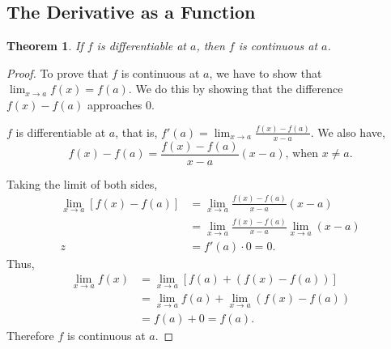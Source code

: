 \documentclass{article}
\newtheorem*{theorem*}{Theorem}
\begin{document}
\subsection{The Derivative as a Function}
\begin{theorem*}
  If $f$ is differentiable at $a$, then $f$ is continuous at $a$.
\end{theorem*}
\begin{proof}
  To prove that $f$ is continuous at $a$, we have to show that $\lim_{x \to a}f(x)=f(a)$. We do this
  by showing that the difference $f(x)-f(a)$ approaches 0.

  $f$ is differentiable at $a$, that is, $f'(a)=\lim_{x \to a}\frac{f(x)-f(a)}{x-a}$. We also have,
  \[f(x)-f(a)=\frac{f(x)-f(a)}{x-a}(x-a)\text{, when $x \neq a.$}\]

  Taking the limit of both sides,
  \begin{align*}
    \lim_{x \to a}\left[f(x)-f(a)\right] & = \lim_{x \to a}\frac{f(x)-f(a)}{x-a}(x-a) \\
    & = \lim_{x \to a}\frac{f(x)-f(a)}{x-a}\lim_{x \to a}(x-a) \\z
    & = f'(a)\cdot0 = 0.
  \end{align*}
  Thus,
  \begin{align*}
    \lim_{x \to a}f(x) & = \lim_{x \to a}\left[f(a) + \left(f(x)-f(a)\right)\right] \\
    & = \lim_{x \to a}f(a) + \lim_{x \to a}(f(x)-f(a)) \\
    & = f(a) + 0 = f(a).
  \end{align*}
  Therefore $f$ is continuous at $a$.
\end{proof}
\end{document}
